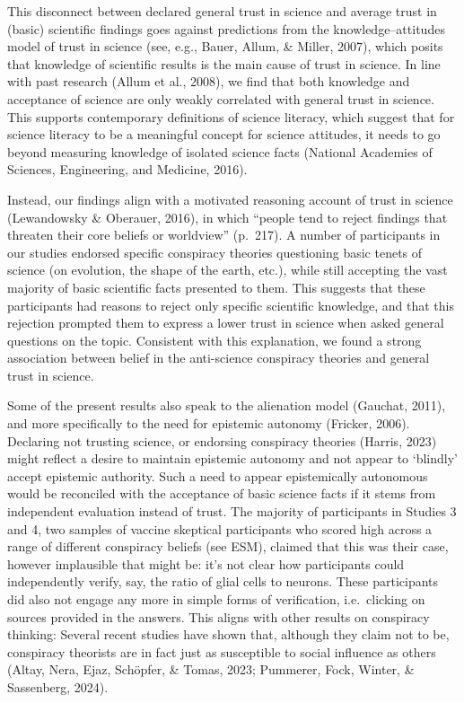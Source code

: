 \documentclass[
  doc,floatsintext]{apa6}
\begin{document}
This disconnect between declared general trust in science and average trust in (basic) scientific findings goes against predictions from the knowledge--attitudes model of trust in science (see, e.g., Bauer, Allum, \& Miller, 2007), which posits that knowledge of scientific results is the main cause of trust in science. In line with past research (Allum et al., 2008), we find that both knowledge and acceptance of science are only weakly correlated with general trust in science. This supports contemporary definitions of science literacy, which suggest that for science literacy to be a meaningful concept for science attitudes, it needs to go beyond measuring knowledge of isolated science facts (National Academies of Sciences, Engineering, and Medicine, 2016).

Instead, our findings align with a motivated reasoning account of trust in science (Lewandowsky \& Oberauer, 2016), in which ``people tend to reject findings that threaten their core beliefs or worldview'' (p.~217). A number of participants in our studies endorsed specific conspiracy theories questioning basic tenets of science (on evolution, the shape of the earth, etc.), while still accepting the vast majority of basic scientific facts presented to them. This suggests that these participants had reasons to reject only specific scientific knowledge, and that this rejection prompted them to express a lower trust in science when asked general questions on the topic. Consistent with this explanation, we found a strong association between belief in the anti-science conspiracy theories and general trust in science.

Some of the present results also speak to the alienation model (Gauchat, 2011), and more specifically to the need for epistemic autonomy (Fricker, 2006). Declaring not trusting science, or endorsing conspiracy theories (Harris, 2023) might reflect a desire to maintain epistemic autonomy and not appear to `blindly' accept epistemic authority. Such a need to appear epistemically autonomous would be reconciled with the acceptance of basic science facts if it stems from independent evaluation instead of trust. The majority of participants in Studies 3 and 4, two samples of vaccine skeptical participants who scored high across a range of different conspiracy beliefs (see ESM), claimed that this was their case, however implausible that might be: it's not clear how participants could independently verify, say, the ratio of glial cells to neurons. These participants did also not engage any more in simple forms of verification, i.e.~clicking on sources provided in the answers. This aligns with other results on conspiracy thinking: Several recent studies have shown that, although they claim not to be, conspiracy theorists are in fact just as susceptible to social influence as others (Altay, Nera, Ejaz, Schöpfer, \& Tomas, 2023; Pummerer, Fock, Winter, \& Sassenberg, 2024).
\end{document}
